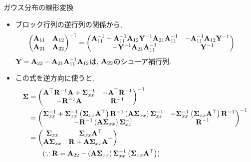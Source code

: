 \documentclass[dvipdfmx,notheorems,t]{beamer}
\begin{document}
\begin{frame}{ガウス分布の線形変換}
\begin{itemize}
  \item ブロック行列の逆行列の関係から,
  {\small \begin{align*}
    \mqty(\vb{A}_{11} & \vb{A}_{12} \\ \vb{A}_{21} & \vb{A}_{22})^{-1}
    &= \mqty(\vb{A}_{11}^{-1} + \vb{A}_{11}^{-1} \vb{A}_{12} \vb{Y}^{-1} \vb{A}_{21} \vb{A}_{11}^{-1}
      & -\vb{A}_{11}^{-1} \vb{A}_{12} \vb{Y}^{-1} \\
      -\vb{Y}^{-1} \vb{A}_{21} \vb{A}_{11}^{-1} & \vb{Y}^{-1})
  \end{align*}}
  $\vb{Y} = \vb{A}_{22} - \vb{A}_{21} \vb{A}_{11}^{-1} \vb{A}_{12}$は, $\vb{A}_{22}$のシューア補行列.
  \item この式を逆方向に使うと,
  {\small \begin{align*}
    \vb{\Sigma} &= \mqty(\vb{A}^\top \vb{R}^{-1} \vb{A} + \vb{\Sigma}_{xx}^{-1} & -\vb{A}^\top \vb{R}^{-1} \\
      -\vb{R}^{-1} \vb{A} & \vb{R}^{-1})^{-1} \\
    &= \mqty(\vb{\Sigma}_{xx}^{-1} + \vb{\Sigma}_{xx}^{-1} \left( \vb{\Sigma}_{xx} \vb{A}^\top \right)
      \vb{R}^{-1} \left( \vb{A} \vb{\Sigma}_{xx} \right) \vb{\Sigma}_{xx}^{-1} &
      -\vb{\Sigma}_{xx}^{-1} \left( \vb{\Sigma}_{xx} \vb{A}^\top \right) \vb{R}^{-1} \\
      -\vb{R}^{-1} \left( \vb{A} \vb{\Sigma}_{xx} \right) \vb{\Sigma}_{xx}^{-1} & \vb{R}^{-1})^{-1} \\
    &= \mqty(\vb{\Sigma}_{xx} & \vb{\Sigma}_{xx} \vb{A}^\top \\
      \vb{A} \vb{\Sigma}_{xx} & \vb{R} + \vb{A} \vb{\Sigma}_{xx} \vb{A}^\top) \\
    & \qquad
      (\because \vb{R} = \vb{A}_{22} - \left( \vb{A} \vb{\Sigma}_{xx} \right) \vb{\Sigma}_{xx}^{-1}
      \left( \vb{\Sigma}_{xx} \vb{A}^\top \right))
  \end{align*}}
\end{itemize}
\end{frame}
\end{document}
